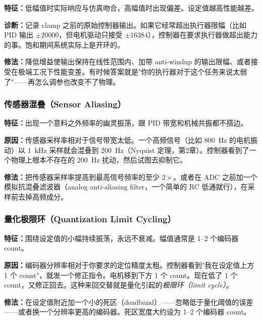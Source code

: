 \textbf{特征：}低幅值时实际响应与仿真吻合，高幅值时出现偏差。设定值越高性能越差。

\textbf{诊断：}记录 clamp 之前的原始控制器输出。如果它经常超出执行器限幅（比如 PID 输出 $\pm 20000$，但电机驱动只接受 $\pm 16384$），控制器在要求执行器做超出能力的事。饱和期间系统实际上是开环的。

\textbf{修法：}降低增益使输出保持在线性范围内、加带 anti-windup 的输出限幅、或者接受在极端工况下性能变差。有时候答案就是"你的执行器对于这个任务来说太弱了"——再怎么调参也改变不了物理。

\subsubsection{传感器混叠（Sensor Aliasing）}

\textbf{特征：}出现一个意料之外频率的幽灵振荡，跟 PID 带宽和机械共振都不搭边。

\textbf{原因：}传感器采样率相对于信号带宽太低。一个高频信号（比如 800~Hz 的电机振动）以 1~kHz 采样就会混叠到 200~Hz（Nyquist 定理，第2章）。控制器看到了一个物理上根本不存在的 200~Hz 扰动，然后试图去抑制它。

\textbf{修法：}把传感器采样率提高到最高信号频率的至少 $2\times$。或者在 ADC 之前加一个模拟抗混叠滤波器（analog anti-aliasing filter，一个简单的 RC 低通就行），在采样前去掉高频成分。

\subsubsection{量化极限环（Quantization Limit Cycling）}

\textbf{特征：}围绕设定值的小幅持续振荡，永远不衰减。幅值通常是 1--2 个编码器 count。

\textbf{原因：}编码器分辨率相对于你要求的定位精度太粗。控制器看到"我在设定值上方 1 个 count"，就发一个修正指令。电机移到下方 1 个 count。现在低了 1 个 count，又修正回去。这种来回交替就是量化引起的\textit{极限环（limit cycle）}。

\textbf{修法：}在设定值附近加一个小的死区（deadband）——忽略低于量化阈值的误差——或者换一个分辨率更高的编码器。死区宽度大约设为 1--2 个编码器 count。

